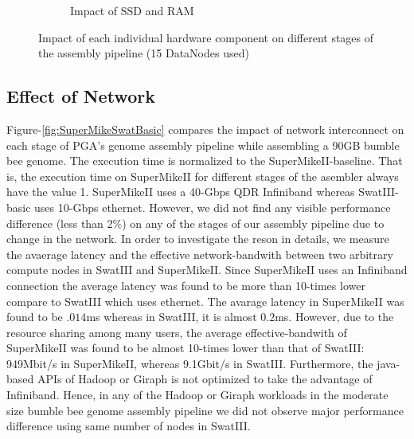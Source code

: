 \documentclass[conference]{IEEEtran}
\begin{document}
\begin{figure}[htb]
\begin{subfigure}[b]{0.5\textwidth}
                \caption{Impact of SSD and RAM}
                \label{fig:SuperMikeSwatStorageMemory}
   \end{subfigure}
   \caption{Impact of each individual hardware component on different stages of the assembly pipeline (15 DataNodes used)}
  \label{fig:SuperMikeSwat}
\end{figure}


\subsection {Effect of Network} \label{EffectOfNetwork}
Figure-\ref{fig:SuperMikeSwatBasic} compares the impact of network interconnect on each stage of PGA's genome assembly pipeline while assembling a 90GB bumble bee genome. 
The execution time is normalized to the SuperMikeII-baseline. That is, the execution time on SuperMikeII for different stages of the asembler always have the value 1.
SuperMikeII uses a 40-Gbps QDR Infiniband whereas SwatIII-basic uses 10-Gbps ethernet. 
However, we did not find any visible performance difference (less than 2\%) on any of the stages of our assembly pipeline due to change in the network.
In order to investigate the reson in details, we measure the avaerage latency and the effective network-bandwith between two arbitrary compute nodes in SwatIII and SuperMikeII.
Since SuperMikeII uses an Infiniband connection the average latency was found to be more than 10-times lower compare to SwatIII which uses ethernet.
The avarage latency in SuperMikeII was found to be $.014$ms whereas in SwatIII, it is almost $0.2$ms.
However, due to the resource sharing among many users, the average effective-bandwith of SuperMikeII was found to be almost 10-times lower than that of SwatIII: 949Mbit/s in SuperMikeII, whereas 9.1Gbit/s in SwatIII.
Furthermore, the java-based APIs of Hadoop or Giraph is not optimized to take the advantage of Infiniband. 
Hence, in any of the Hadoop or Giraph workloads in the moderate size bumble bee genome assembly pipeline we did not observe major performance difference using same number of nodes in SwatIII.
 

\end{document}
